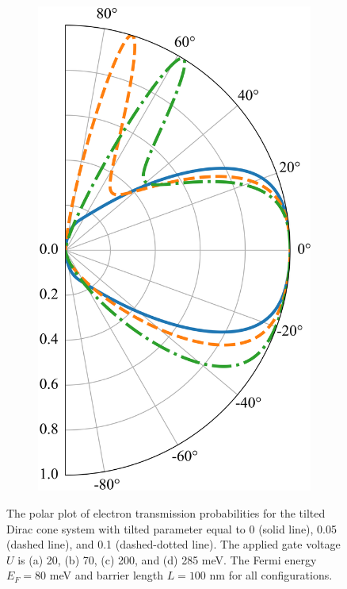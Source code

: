 \begin{figure}[H]
\begin{subfigure}[b]{0.3\linewidth}
            \includegraphics[width = \linewidth]{fig/tunneling shift/U0.285.png}
            \caption{}
            \label{fig:asym4}
        \end{subfigure}
        \caption{The polar plot of electron transmission probabilities for the tilted Dirac cone system with tilted parameter equal to 0 (solid line), 0.05 (dashed line), and 0.1 (dashed-dotted line).
                    The applied gate voltage $U$ is (a) 20, (b) 70, (c) 200, and (d) 285 meV. 
                    The Fermi energy $E_F = 80$ meV and barrier length  $L = 100$ nm for all configurations.}
        \label{fig:asym}
    \end{figure}

